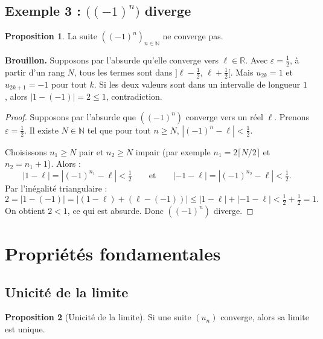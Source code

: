 \documentclass[12pt,a4paper,openany]{book}
\theoremstyle{definition}
\newtheorem{proposition}{Proposition}[chapter]
\newcommand{\N}{\mathbb{N}}
\newcommand{\R}{\mathbb{R}}
\newcommand{\eps}{\varepsilon}
\newcommand{\abs}[1]{\left\lvert #1 \right\rvert}
\begin{document}
\subsection{Exemple 3 : $\bigl((-1)^n\bigr)$ diverge}

\begin{proposition}\label{prop:moins-un-puiss-n-diverge}
  La suite $((-1)^n)_{n \in \N}$ ne converge pas.
\end{proposition}

\noindent\textbf{Brouillon.}
Supposons par l'absurde qu'elle converge vers $\ell \in \R$.
Avec $\eps = \frac{1}{2}$, à partir d'un rang $N$, tous les termes sont dans
$]\ell - \frac{1}{2},\, \ell + \frac{1}{2}[$. Mais $u_{2k} = 1$ et $u_{2k+1} = -1$
pour tout $k$. Si les deux valeurs sont dans un intervalle de longueur $1$, alors
$\abs{1 - (-1)} = 2 \leq 1$, contradiction.

\begin{proof}
  Supposons par l'absurde que $((-1)^n)$ converge vers un réel $\ell$.
  Prenons $\eps = \frac{1}{2}$. Il existe $N \in \N$ tel que pour tout $n \geq N$,
  $\abs{(-1)^n - \ell} < \frac{1}{2}$.

  Choisissons $n_1 \geq N$ pair et $n_2 \geq N$ impair (par exemple $n_1 = 2\lceil N/2 \rceil$
  et $n_2 = n_1 + 1$). Alors :
  \[
    \abs{1 - \ell} = \abs{(-1)^{n_1} - \ell} < \tfrac{1}{2}
    \qquad \text{et} \qquad
    \abs{-1 - \ell} = \abs{(-1)^{n_2} - \ell} < \tfrac{1}{2}.
  \]
  Par l'inégalité triangulaire :
  \[
    2 = \abs{1 - (-1)} = \abs{(1 - \ell) + (\ell - (-1))}
      \leq \abs{1 - \ell} + \abs{-1 - \ell}
      < \tfrac{1}{2} + \tfrac{1}{2} = 1.
  \]
  On obtient $2 < 1$, ce qui est absurde. Donc $((-1)^n)$ diverge.
\end{proof}

\section{Propriétés fondamentales}\label{sec:suites:proprietes}

\subsection{Unicité de la limite}

\begin{proposition}[Unicité de la limite]\label{prop:unicite-limite}
  Si une suite $(u_n)$ converge, alors sa limite est unique.
\end{proposition}
\end{document}
